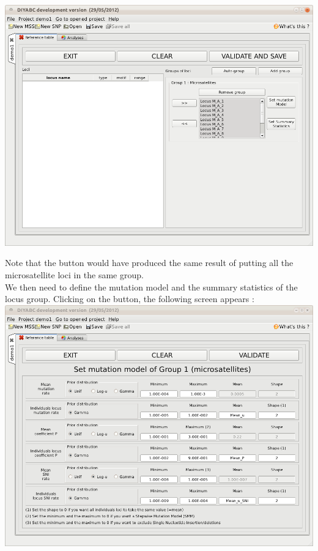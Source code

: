 \includegraphics[scale=0.35]{gui_pictures/Capture-DIYABC-18}

Note that the  button would have produced
the same result of putting all the microsatellite loci in the same
group.\\


We then need to define the mutation model and the summary statistics
of the locus group. Clicking on the 
button, the following screen appears :\\


\includegraphics[scale=0.35]{gui_pictures/Capture-DIYABC-19}

